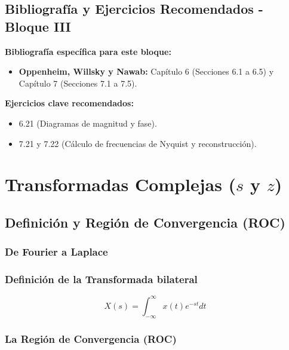 \documentclass[11pt,a4paper,openany]{book}
\begin{document}
\chapter*{Bibliografía y Ejercicios Recomendados - Bloque III}

\textbf{Bibliografía específica para este bloque:}
\begin{itemize}
	\item \textbf{Oppenheim, Willsky y Nawab:} Capítulo 6 (Secciones 6.1 a 6.5) y Capítulo 7 (Secciones 7.1 a 7.5).
\end{itemize}

\textbf{Ejercicios clave recomendados:}
\begin{itemize}
	\item 6.21 (Diagramas de magnitud y fase).
	\item 7.21 y 7.22 (Cálculo de frecuencias de Nyquist y reconstrucción).
\end{itemize}


\part{Transformadas Complejas ($s$ y $z$)}


\chapter{Definición y Región de Convergencia (ROC)}

\section{De Fourier a Laplace}

\section{Definición de la Transformada bilateral}
\begin{equation}
	X(s) = \int_{-\infty}^{\infty} x(t) e^{-st} dt
\end{equation}

\section{La Región de Convergencia (ROC)}
\end{document}
